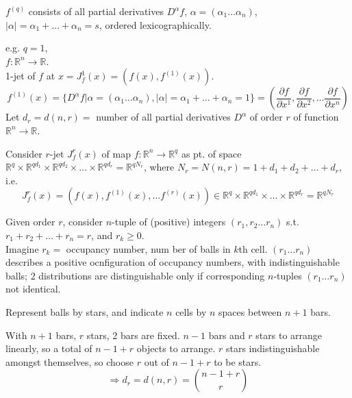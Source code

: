 \documentclass[10pt]{amsart}
\newcommand{\exercisehead}[1]
  { \smallskip
   \noindent{\small\bf Exercise #1.}
  }
\begin{document}
\begin{multicols*}{2}
$f^{(q)}$ consists of all partial derivatives $D^{\alpha}f$, $\alpha= (\alpha_1\dots \alpha_n)$, $|\alpha| = \alpha_1 + \dots + \alpha_n =s$, ordered lexicographically.  

e.g. $q=1$, \\
$f: \mathbb{R}^n \to \mathbb{R}$.   \\
1-jet of $f$ at $x = J_f^1(x) = (f(x), f^{(1)}(x))$.  
\[
f^{(1)}(x) = \lbrace D^{\alpha}f| \alpha = (\alpha_1 \dots \alpha_n), |\alpha| = \alpha_1  + \dots + \alpha_n  =1 \rbrace = \left( \frac{ \partial f}{ \partial x^1 }, \frac{ \partial f}{ \partial x^2 } , \dots \frac{ \partial f}{ \partial x^n } \right)
\]
Let $d_r = d(n,r) = $ number of all partial derivatives $D^{\alpha}$ of order $r$ of function $\mathbb{R}^n \to \mathbb{R}$.  

Consider $r$-jet $J^r_f(x)$ of map $f:\mathbb{R}^n\to \mathbb{R}^q$ as pt. of space $\mathbb{R}^q \times \mathbb{R}^{qd_1} \times \mathbb{R}^{qd_2} \times \dots \times \mathbb{R}^{qd_r} = \mathbb{R}^{q N_r}$, where $N_r = N(n,r) = 1 + d_1 + d_2 + \dots + d_r$, i.e. 
\[
J_f^r(x) = (f(x),f^{(1)}(x) , \dots f^{(r)}(x) ) \in \mathbb{R}^q \times \mathbb{R}^{qd_1} \times  \dots \times \mathbb{R}^{qd_r} = \mathbb{R}^{q N_r}
\]


\exercisehead{1}  

Given order $r$, consider $n$-tuple of (positive) integers $(r_1,r_2\dots r_n)$ s.t. $r_1 + r_2 + \dots + r_n = r$, and $r_k\geq 0$. \\
 Imagine $r_k = $ occupancy number, num ber of balls in $k$th cell.  $(r_1\dots r_n)$ describes a positive ocnfiguration of occupancy numbers, with indistinguishable balls; 2 distributions are distinguishable only if corresponding $n$-tuples $(r_1 \dots r_n)$ not identical.  

Represent balls by stars, and indicate $n$ cells by $n$ spaces between $n+1$ bars.  

With $n+1$ bars, $r$ stars, 2 bars are fixed. $n-1$ bars and $r$ stars to arrange linearly, so a total of $n-1+r$ objects to arrange.  $r$ stars indistinguishable amongst themselves, so choose $r$ out of $n-1+r$ to be stars.  
\begin{equation}
\Longrightarrow d_r = d(n,r)=\binom{n-1+r}{r}
\end{equation}


\end{multicols*}
\end{document}
